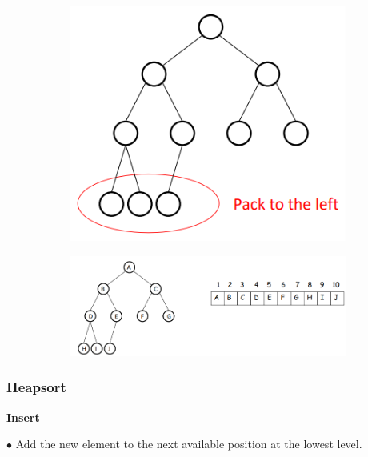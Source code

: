 \documentclass[10pt]{article}
\begin{document}
\begin{figure}[h]
	\centering
	\begin{subfigure}[b]{0.2\textwidth}
		\centering
		\includegraphics[width=\textwidth]{img4-2}
	\end{subfigure}
	\begin{subfigure}[b]{0.5\textwidth}
		\centering
		\includegraphics[width=\textwidth]{img4-3}
	\end{subfigure}
\end{figure}

\subsubsection{Heapsort}

\textbf{Insert}

$\bullet$ Add the new element to the next available position at the lowest level.
\end{document}
